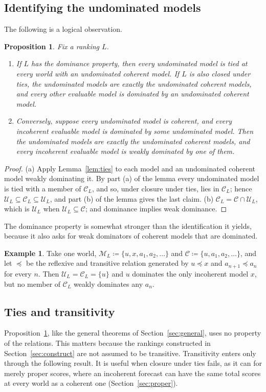 \documentclass[11pt]{article}
\newtheorem{proposition}[theorem]{Proposition}
\theoremstyle{definition}
\newtheorem{example}[theorem]{Example}
\theoremstyle{remark}
\newcommand{\M}{\mathcal M}
\newcommand{\C}{\mathcal C}
\newcommand{\U}{\mathcal U}
\begin{document}
\subsection{Identifying the undominated models}
The following is a logical observation.
\begin{proposition}\label{prop:conclusion}
Fix a ranking $L$.
\begin{enumerate}[label=(\alph*)]
\item If $L$ has the dominance property, then every undominated model is tied at every world with an undominated coherent model. If $L$ is also closed under ties, the undominated models are exactly the undominated coherent models, and every other evaluable model is dominated by an undominated coherent model.
\item Conversely, suppose every undominated model is coherent, and every incoherent evaluable model is dominated by some undominated model. Then the undominated models are exactly the undominated coherent models, and every incoherent evaluable model is weakly dominated by one of them.
\end{enumerate}
\end{proposition}
\begin{proof}
(a) Apply Lemma~\ref{lem:ties} to each model and an undominated coherent model weakly dominating it. By part (a) of the lemma every undominated model is tied with a member of $\C_L$, and so, under closure under ties, lies in $\C_L$; hence $\U_L\subseteq\C_L\subseteq\U_L$, and part (b) of the lemma gives the last claim.
(b) $\C_L=\C\cap\U_L$, which is $\U_L$ when $\U_L\subseteq\C$; and dominance implies weak dominance.
\end{proof}

The dominance property is somewhat stronger than the identification it yields, because it also asks for weak dominators of coherent models that are dominated.
\begin{example}\label{ex:conclusion-stronger}
Take one world, $\M_L\coloneqq\{u,x,a_1,a_2,\dots\}$ and $\C\coloneqq\{u,a_1,a_2,\dots\}$, and let $\preceq$ be the reflexive and transitive relation generated by $u\preceq x$ and $a_{n+1}\preceq a_n$ for every $n$. Then $\U_L=\C_L=\{u\}$ and $u$ dominates the only incoherent model $x$, but no member of $\C_L$ weakly dominates any $a_n$.
\end{example}

\subsection{Ties and transitivity}
Proposition~\ref{prop:conclusion}, like the general theorems of Section~\ref{sec:general}, uses no property of the relations. This matters because the rankings constructed in Section~\ref{sec:construct} are not assumed to be transitive. Transitivity enters only through the following result. It is useful when closure under ties fails, as it can for merely proper scores, where an incoherent forecast can have the same total scores at every world as a coherent one (Section~\ref{sec:proper}).
\end{document}
